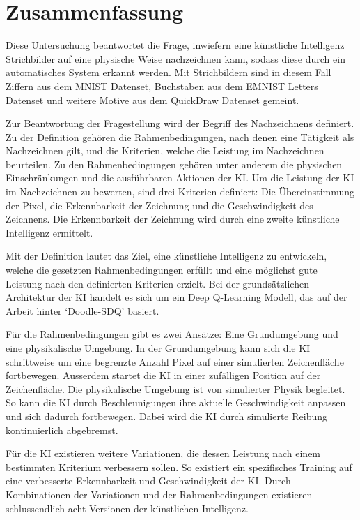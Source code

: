\chapter{Zusammenfassung}\label{zusammenfassung}
Diese Untersuchung beantwortet die Frage, inwiefern eine künstliche Intelligenz
Strichbilder auf eine physische Weise nachzeichnen kann, sodass diese durch ein
automatisches System erkannt werden. Mit Strichbildern sind in diesem
Fall Ziffern aus dem MNIST Datenset, Buchstaben aus dem EMNIST Letters Datenset und
weitere Motive aus dem QuickDraw Datenset gemeint.
 
Zur Beantwortung der Fragestellung wird der Begriff des Nachzeichnens definiert.
Zu der Definition gehören die Rahmenbedingungen, nach denen eine Tätigkeit als
Nachzeichnen gilt, und die Kriterien, welche die Leistung im Nachzeichnen
beurteilen. Zu den Rahmenbedingungen gehören unter anderem die physischen
Einschränkungen und die ausführbaren Aktionen der KI. Um die Leistung der KI im
Nachzeichnen zu bewerten, sind drei Kriterien definiert: Die Übereinstimmung der
Pixel, die Erkennbarkeit der Zeichnung und die Geschwindigkeit des Zeichnens.
Die Erkennbarkeit der Zeichnung wird durch eine zweite künstliche Intelligenz
ermittelt.
 
Mit der Definition lautet das Ziel, eine künstliche Intelligenz zu entwickeln, welche die gesetzten
Rahmenbedingungen erfüllt und eine möglichst gute Leistung nach den definierten
Kriterien erzielt. Bei der grundsätzlichen Architektur der KI handelt es sich um
ein Deep Q-Learning Modell, das auf der Arbeit hinter `Doodle-SDQ'
\cite{zhou_learning_2018} basiert.
 
Für die Rahmenbedingungen gibt es zwei Ansätze: Eine Grundumgebung und eine
physikalische Umgebung. In der Grundumgebung kann sich die KI schrittweise um
eine begrenzte Anzahl Pixel auf einer simulierten Zeichenfläche fortbewegen.
Ausserdem startet die KI in einer zufälligen Position auf der Zeichenfläche. Die
physikalische Umgebung ist von simulierter Physik begleitet. So kann die KI
durch Beschleunigungen ihre aktuelle Geschwindigkeit anpassen und sich dadurch
fortbewegen. Dabei wird die KI durch simulierte Reibung kontinuierlich
abgebremst.
 
Für die KI existieren weitere Variationen, die dessen Leistung nach einem
bestimmten Kriterium verbessern sollen. So existiert ein spezifisches Training
auf eine verbesserte Erkennbarkeit und Geschwindigkeit der KI. Durch
Kombinationen der Variationen und der Rahmenbedingungen existieren
schlussendlich acht Versionen der künstlichen Intelligenz.
 
